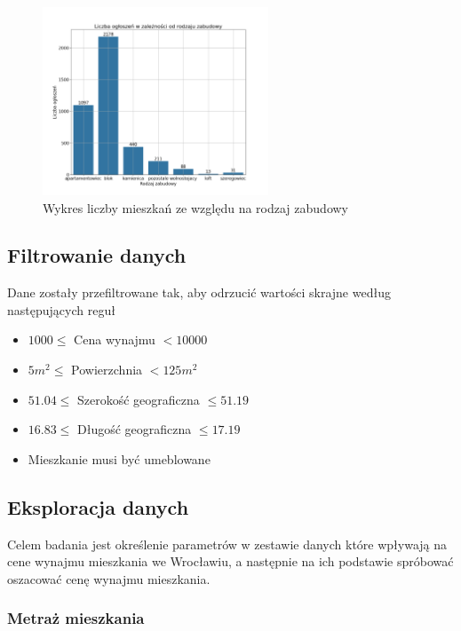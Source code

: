 \documentclass[10pt]{article}
\begin{document}
\begin{figure}[H]
    \centering
    \includegraphics[width=0.6\textwidth]{builttype-count-unfiltered.png}
    \caption{Wykres liczby mieszkań ze względu na rodzaj zabudowy}
    \label{fig:builttype_count_unfiltered}
\end{figure}

\subsection{Filtrowanie danych}
Dane zostały przefiltrowane tak, aby odrzucić wartości skrajne według następujących reguł

\begin{itemize}
    \item $ 1000 \leq $ Cena wynajmu $ < 10000 $
    \item $ 5m^2 \leq $ Powierzchnia $ < 125m^2 $
    \item $ 51.04 \leq $ Szerokość geograficzna $ \leq 51.19 $
    \item $ 16.83 \leq $ Długość geograficzna  $ \leq 17.19 $
    \item Mieszkanie musi być umeblowane
\end{itemize}



\subsection{Eksploracja danych}
Celem badania jest określenie parametrów w zestawie danych które wpływają na cene wynajmu mieszkania we Wrocławiu, a następnie na ich podstawie spróbować oszacować cenę wynajmu mieszkania.

\subsubsection{Metraż mieszkania}
\end{document}
